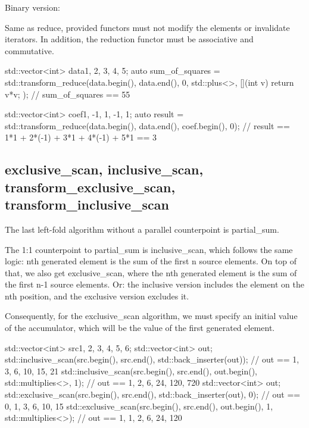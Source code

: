 Binary version:


Same as reduce, provided functors must not modify the elements or invalidate iterators. In addition, the reduction functor must be associative and commutative.

\begin{box-note}
\begin{cppcode}
std::vector<int> data{1, 2, 3, 4, 5};
auto sum_of_squares = std::transform_reduce(data.begin(), data.end(), 0, 
                                            std::plus<>{}, [](int v) { return v*v; });
// sum_of_squares == 55

std::vector<int> coef{1, -1, 1, -1, 1};
auto result = std::transform_reduce(data.begin(), data.end(), coef.begin(), 0);
// result == 1*1 + 2*(-1) + 3*1 + 4*(-1) + 5*1 == 3
\end{cppcode}
\end{box-note}

\subsection{exclusive\_scan, inclusive\_scan, transform\_exclusive\_scan, transform\_inclusive\_scan}

The last left-fold algorithm without a parallel counterpoint is partial\_sum.



The 1:1 counterpoint to partial\_sum is inclusive\_scan, which follows the same logic: nth generated element is the sum of the first n source elements. On top of that, we also get exclusive\_scan, where the nth generated element is the sum of the first n-1 source elements. Or: the inclusive version includes the element on the nth position, and the exclusive version excludes it.

Consequently, for the exclusive\_scan algorithm, we must specify an initial value of the accumulator, which will be the value of the first generated element.

\begin{box-note}
\begin{cppcode}
std::vector<int> src{1, 2, 3, 4, 5, 6};
{
    std::vector<int> out;
    std::inclusive_scan(src.begin(), src.end(), std::back_inserter(out));
    // out == {1, 3, 6, 10, 15, 21}
    std::inclusive_scan(src.begin(), src.end(), out.begin(), std::multiplies<>{}, 1);
    // out == {1, 2, 6, 24, 120, 720}
}
{
    std::vector<int> out;
    std::exclusive_scan(src.begin(), src.end(), std::back_inserter(out), 0);
    // out == {0, 1, 3, 6, 10, 15}
    std::exclusive_scan(src.begin(), src.end(), out.begin(), 1, std::multiplies<>{});
    // out == {1, 1, 2, 6, 24, 120}
}
\end{cppcode}
\end{box-note}

